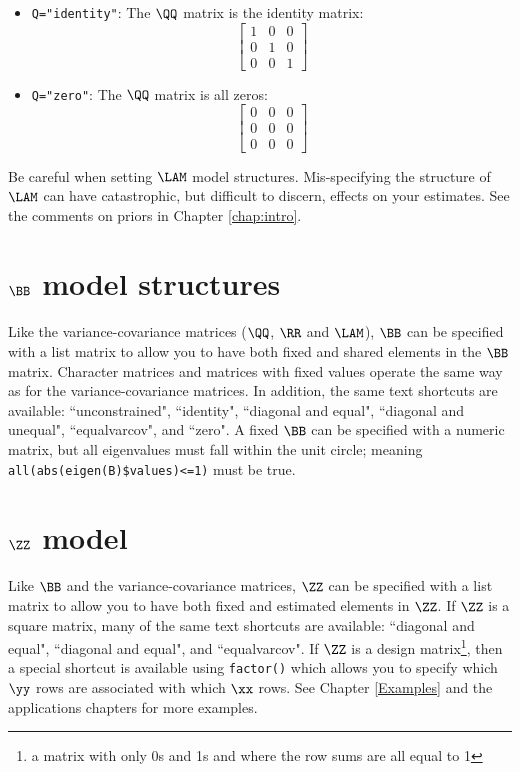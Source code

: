 \begin{itemize}
\item[] \texttt{Q="identity"}: The $\QQ$ matrix is the identity matrix:
\begin{equation*}
 \left[ \begin{array}{ccc}
    1 & 0 & 0\\
    0 & 1 & 0 \\
    0 & 0 & 1 \end{array} \right]
\end{equation*}

\item[] \texttt{Q="zero"}: The $\QQ$ matrix is all zeros:
\begin{equation*}
 \left[ \begin{array}{ccc}
    0 & 0 & 0\\
    0 & 0 & 0 \\
    0 & 0 & 0 \end{array} \right]
\end{equation*}
\end{itemize}

Be careful when setting $\LAM$ model structures.  Mis-specifying the structure of $\LAM$ can have catastrophic, but difficult to discern, effects on your estimates.  See the comments on priors in Chapter \ref{chap:intro}.

\section{$\BB$ model structures}

Like the variance-covariance matrices ($\QQ$, $\RR$ and $\LAM$), $\BB$ can be specified with a list matrix to allow you to have both fixed and shared elements in the $\BB$ matrix.  Character matrices and matrices with fixed values operate the same way as for the variance-covariance matrices.  In addition, the same text shortcuts are available: ``unconstrained", ``identity", ``diagonal and equal", ``diagonal and unequal", ``equalvarcov", and ``zero".  A fixed $\BB$ can be specified with a numeric matrix, but  all eigenvalues must fall within the unit circle; meaning \texttt{all(abs(eigen(B)\$values)<=1)} must be true.  

\section{$\ZZ$ model}

Like $\BB$ and the variance-covariance matrices, $\ZZ$ can be specified with a list matrix to allow you to have both fixed and estimated elements in $\ZZ$. If $\ZZ$ is a square matrix, many of the same text shortcuts are available: ``diagonal and equal", ``diagonal and equal", and ``equalvarcov".  If $\ZZ$ is a design matrix\footnote{a matrix with only 0s and 1s and where the row sums are all equal to 1}, then a special shortcut is available using \texttt{factor()} which allows you to specify which $\yy$ rows are associated with which $\xx$ rows.  See Chapter \ref{Examples} and the applications chapters for more examples.

